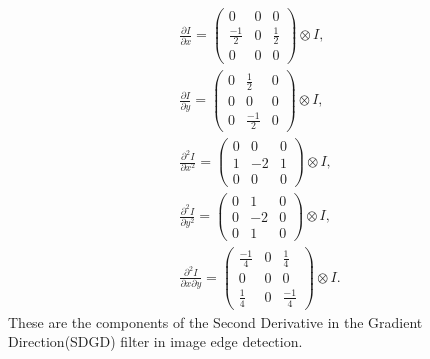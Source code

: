 \documentclass[apj]{emulateapj}
\begin{document}
\begin{gather}
\frac{\partial I}{\partial x}=\begin{pmatrix}0 & 0 &
0\\ \frac{-1}{2} & 0 & \frac{1}{2} \\0 & 0 & 0\end{pmatrix}\otimes I,\\
\frac{\partial I}{\partial y}=\begin{pmatrix}0 & \frac{1}{2} &
0\\ 0  & 0 & 0\\0 & \frac{-1}{2} & 0\end{pmatrix}\otimes I,\\
\frac{\partial^2 I}{\partial x^2}=\begin{pmatrix}0 & 0 &
0\\ 1  & -2 & 1\\0 & 0 & 0\end{pmatrix}\otimes I,\\
\frac{\partial^2 I}{\partial y^2}=\begin{pmatrix}0 & 1 &
0\\ 0  & -2 & 0\\0 & 1 & 0\end{pmatrix}\otimes I,\\
\frac{\partial^2 I}{\partial x \partial y}=\begin{pmatrix}\frac{-1}{4} & 0 &
\frac{1}{4}\\ 0  & 0 & 0\\ \frac{1}{4} & 0 & \frac{-1}{4}\end{pmatrix}\otimes I.
\end{gather}
These are the components of the Second Derivative
in the Gradient Direction(SDGD) filter in image edge detection.
\end{document}
